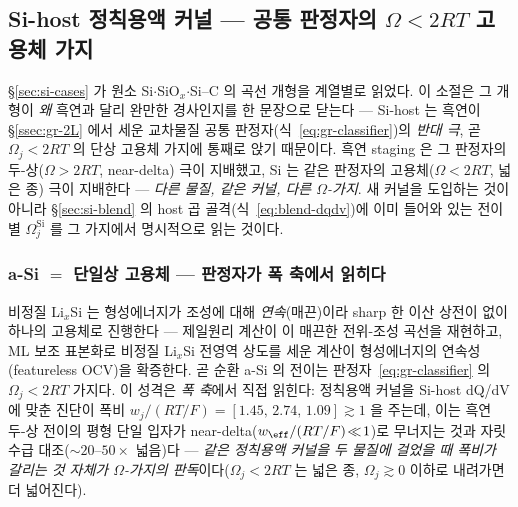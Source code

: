 \subsection{Si-host 정칙용액 커널 --- 공통 판정자의 $\Omega<2RT$ 고용체 가지}\label{ssec:si-frumkin}
\S\ref{sec:si-cases} 가 원소 Si$\cdot$SiO$_x$$\cdot$Si--C 의 곡선 개형을 계열별로 읽었다. 이 소절은 그 개형이
\emph{왜} 흑연과 달리 완만한 경사인지를 한 문장으로 닫는다 --- Si-host 는 흑연이 \S\ref{ssec:gr-2L} 에서 세운
교차물질 공통 판정자(식~\eqref{eq:gr-classifier})의 \emph{반대 극}, 곧 $\Omega_j<2RT$ 의 단상 고용체 가지에
통째로 앉기 때문이다. 흑연 staging 은 그 판정자의 두-상($\Omega>2RT$, near-delta) 극이 지배했고, Si 는 같은
판정자의 고용체($\Omega<2RT$, 넓은 종) 극이 지배한다 --- \emph{다른 물질, 같은 커널, 다른 $\Omega$-가지}. 새
커널을 도입하는 것이 아니라 \S\ref{sec:si-blend} 의 host 곱 골격(식~\eqref{eq:blend-dqdv})에 이미 들어와 있는
전이별 $\Omega_j^\mathrm{Si}$ 를 그 가지에서 명시적으로 읽는 것이다.

\subsubsection{a-Si $=$ 단일상 고용체 --- 판정자가 폭 축에서 읽히다}\label{ssec:si-frumkin-single}
비정질 Li$_x$Si 는 형성에너지가 조성에 대해 \emph{연속}(매끈)이라 sharp 한 이산 상전이 없이 하나의 고용체로
진행한다 --- 제일원리 계산이 이 매끈한 전위-조성 곡선을 재현하고\cite{chevrier_dahn2009}, ML 보조 표본화로
비정질 Li$_x$Si 전영역 상도를 세운 계산이 형성에너지의 연속성(featureless OCV)을 확증한다\cite{artrith2018}.
곧 순환 a-Si 의 전이는 판정자~\eqref{eq:gr-classifier} 의 $\Omega_j<2RT$ 가지다. 이 성격은 \emph{폭 축}에서
직접 읽힌다: 정칙용액 커널을 Si-host dQ/dV 에 맞춘 진단이 폭비 $w_j/(RT/F)=[1.45,\,2.74,\,1.09]\gtrsim1$ 을
주는데, 이는 흑연 두-상 전이의 평형 단일 입자가 near-delta($w_\eff/(RT/F)\!\ll\!1$)로 무너지는 것과 자릿수급
대조($\sim\!20$--$50\times$ 넓음)다 --- \emph{같은 정칙용액 커널을 두 물질에 걸었을 때 폭비가 갈리는 것 자체가
$\Omega$-가지의 판독}이다($\Omega_j<2RT$ 는 넓은 종, $\Omega_j\!\gtrsim\!0$ 이하로 내려가면 더 넓어진다).


